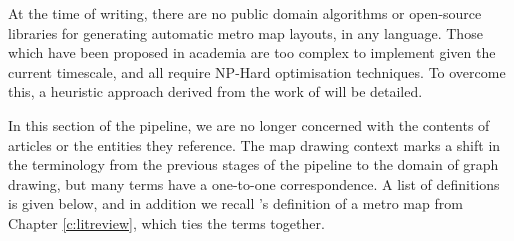 At the time of writing, there are no public domain algorithms or open-source libraries for generating automatic metro map layouts, in any language. Those which have been proposed in academia \citep{AutomaticMetroMapLayoutThesis, AutomatedDrawingOfMetroMaps} are too complex to implement given the current timescale, and all require NP-Hard optimisation techniques. To overcome this, a heuristic approach derived from the work of \citep{AutomaticMetroMapLayoutThesis, AutomaticMetroMapLayout, WhichAesthetic} will be detailed.

In this section of the pipeline, we are no longer concerned with the contents of articles or the entities they reference. The map drawing context marks a shift in the terminology from the previous stages of the pipeline to the domain of graph drawing, but many terms have a one-to-one correspondence. A list of definitions is given below, and in addition we recall \citeauthor{GeneratingInformationMaps}'s definition of a metro map from Chapter \ref{c:litreview}, which ties the terms together.

